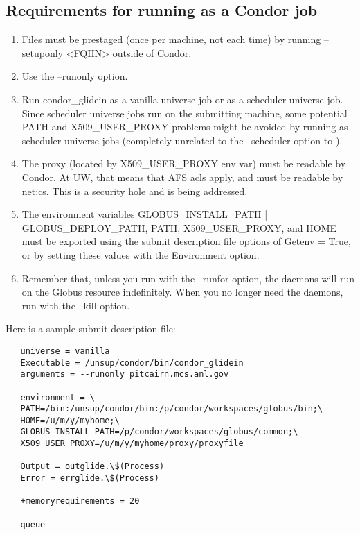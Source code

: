 \subsection{Requirements for running  as a Condor job}
\begin{enumerate}
\item Files must be prestaged (once per machine, not each time) by running
 --setuponly <FQHN> outside of Condor.

\item Use the --runonly option.

\item Run condor_glidein as a vanilla universe job or as a scheduler universe 
job. Since scheduler universe jobs run on the submitting machine, some potential
PATH and X509_USER_PROXY problems might be avoided by running as scheduler universe jobs (completely unrelated to the --scheduler option to ).

\item The proxy (located by X509_USER_PROXY env var) must be readable by
Condor. At UW, that means that AFS acls apply, and must be readable by net:cs. 
This is a security hole and is being addressed.

\item The environment variables {GLOBUS_INSTALL_PATH | GLOBUS_DEPLOY_PATH},
PATH, X509_USER_PROXY, and HOME must be exported using the submit description 
file options of Getenv = True, or by setting these values with the Environment 
option.

\item Remember that, unless you run  with the --runfor option,
the daemons will run on the Globus resource indefinitely. When you no longer
need the daemons, run  with the --kill option.
\end{enumerate}

Here is a sample submit description file:

\begin{verbatim}
   universe = vanilla
   Executable = /unsup/condor/bin/condor_glidein
   arguments = --runonly pitcairn.mcs.anl.gov

   environment = \
   PATH=/bin:/unsup/condor/bin:/p/condor/workspaces/globus/bin;\
   HOME=/u/m/y/myhome;\
   GLOBUS_INSTALL_PATH=/p/condor/workspaces/globus/common;\
   X509_USER_PROXY=/u/m/y/myhome/proxy/proxyfile

   Output = outglide.\$(Process)
   Error = errglide.\$(Process)

   +memoryrequirements = 20

   queue
\end{verbatim}

